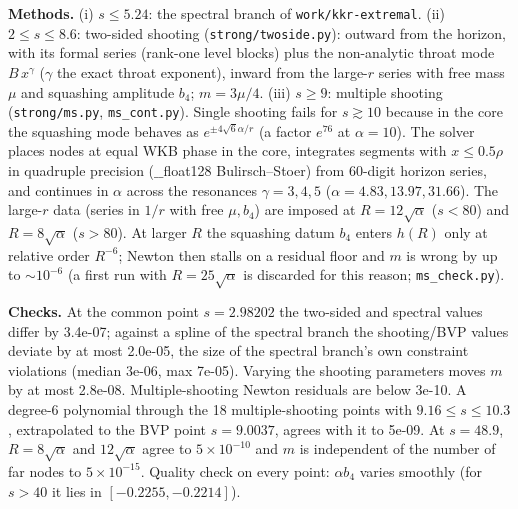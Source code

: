 \textbf{Methods.} (i) $s\le5.24$: the spectral branch of \texttt{work/kkr-extremal}.
(ii) $2\le s\le8.6$: two-sided shooting (\texttt{strong/twoside.py}): outward from the horizon,
with its formal series (rank-one level blocks) plus the non-analytic throat mode $B\,x^\gamma$
($\gamma$ the exact throat exponent), inward from the large-$r$ series with free mass $\mu$ and
squashing amplitude $b_4$; $m=3\mu/4$. (iii) $s\ge9$: multiple shooting (\texttt{strong/ms.py},
\texttt{ms\_cont.py}). Single shooting fails for $s\gtrsim10$ because in the core the squashing
mode behaves as $e^{\pm4\sqrt{6}\alpha/r}$ (a factor $e^{76}$ at $\alpha=10$). The solver places
nodes at equal WKB phase in the core, integrates segments with $x\le0.5\rho$ in quadruple
precision ($\_\_$float128 Bulirsch--Stoer) from 60-digit horizon series, and continues in $\alpha$
across the resonances $\gamma=3,4,5$ ($\alpha=4.83,13.97,31.66$). The large-$r$ data (series in $1/r$
with free $\mu,b_4$) are imposed at $R=12\sqrt\alpha$ ($s<80$) and $R=8\sqrt\alpha$ ($s>80$). At larger $R$
the squashing datum $b_4$ enters $h(R)$ only at relative order $R^{-6}$; Newton then stalls on a residual
floor and $m$ is wrong by up to $\sim10^{-6}$ (a first run with $R=25\sqrt\alpha$ is discarded for this
reason; \texttt{ms\_check.py}).

\textbf{Checks.} At the common point $s=2.98202$ the two-sided and spectral values differ by
3.4e-07; against a spline of the spectral branch the shooting/BVP
values deviate by at most 2.0e-05, the size of the spectral branch's own constraint
violations (median 3e-06, max 7e-05). Varying the shooting parameters moves $m$ by
at most 2.8e-08.
Multiple-shooting Newton residuals are below 3e-10. A degree-6 polynomial through the
18 multiple-shooting points with $9.16\le s\le10.3$, extrapolated to the BVP point $s=9.0037$,
agrees with it to 5e-09. At $s=48.9$, $R=8\sqrt\alpha$ and $12\sqrt\alpha$ agree to $5\times10^{-10}$
and $m$ is independent of the number of far nodes to $5\times10^{-15}$. Quality check on every point:
$\alpha b_4$ varies smoothly (for $s>40$ it lies in $[-0.2255,-0.2214]$).

